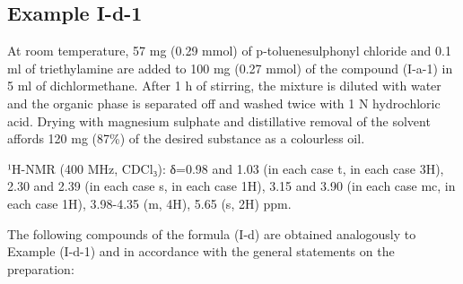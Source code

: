 \documentclass[11pt,a4paper]{article}
\begin{document}
\subsection{Example I-d-1}

At room temperature, 57 mg (0.29 mmol) of p-toluenesulphonyl chloride and 0.1 ml of triethylamine are added to 100 mg (0.27 mmol) of the compound (I-a-1) in 5 ml of dichlormethane. After 1 h of stirring, the mixture is diluted with water and the organic phase is separated off and washed twice with 1 N hydrochloric acid. Drying with magnesium sulphate and distillative removal of the solvent affords 120 mg (87\%) of the desired substance as a colourless oil.

¹H-NMR (400 MHz, CDCl₃): δ=0.98 and 1.03 (in each case t, in each case 3H), 2.30 and 2.39 (in each case s, in each case 1H), 3.15 and 3.90 (in each case mc, in each case 1H), 3.98-4.35 (m, 4H), 5.65 (s, 2H) ppm.

The following compounds of the formula (I-d) are obtained analogously to Example (I-d-1) and in accordance with the general statements on the preparation:
\end{document}

